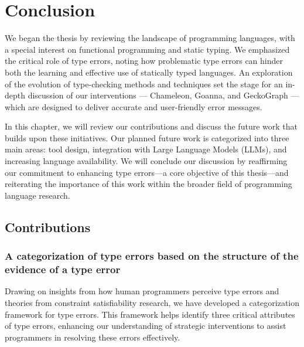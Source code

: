 

\chapter{Conclusion}

\label{chap:conclusion} 
\newcommand{\typetutor}{TypeTutor}

\graphicspath{{Figures/Conclusion}}
We began the thesis by reviewing the landscape of programming languages, with a special interest on functional programming and static typing. We emphasized the critical role of type errors, noting how problematic type errors can hinder both the learning and effective use of statically typed languages. An exploration of the evolution of type-checking methods and techniques set the stage for an in-depth discussion of our interventions --- Chameleon, Goanna, and GeckoGraph --- which are designed to deliver accurate and user-friendly error messages.

In this chapter, we will review our contributions and discuss the future work that builds upon these initiatives. Our planned future work is categorized into three main areas: tool design, integration with Large Language Models (LLMs), and increasing language availability. We will conclude our discussion by reaffirming our commitment to enhancing type errors—a core objective of this thesis—and reiterating the importance of this work within the broader field of programming language research.


\section{Contributions}


\subsection{A categorization of type errors based on the structure of the evidence of a type error}


Drawing on insights from how human programmers perceive type errors and theories from constraint satisfiability research, we have developed a categorization framework for type errors. This framework helps identify three critical attributes of type errors, enhancing our understanding of strategic interventions to assist programmers in resolving these errors effectively.

